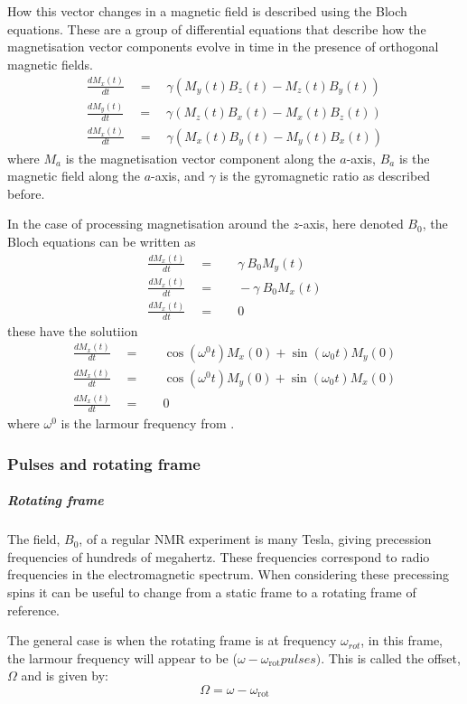 How this vector changes in a magnetic field is described using the Bloch equations\citep{Bloch:1946hk}. These are a group of differential equations that
describe how the magnetisation vector components evolve in time in the
presence of orthogonal magnetic fields.
\begin{align}\label{eqn:Bloch}
  \frac{dM_x(t)}{dt}\quad=\quad\gamma(M_y(t)B_z(t)-M_z(t)B_y(t))\\
  \frac{dM_y(t)}{dt}\quad=\quad\gamma(M_z(t)B_x(t)-M_x(t)B_z(t))\\
  \frac{dM_x(t)}{dt}\quad=\quad\gamma(M_x(t)B_y(t)-M_y(t)B_x(t))
\end{align}
where $M_a$ is the magnetisation vector component along the $a$-axis, $B_a$ is the
magnetic field along the $a$-axis, and $\gamma$ is the gyromagnetic ratio as described before.

In the case of processing magnetisation around the $z$-axis, here denoted $B_0$, the
Bloch equations can be written as
\begin{align}
  \frac{dM_x(t)}{dt}\quad=&\quad\gamma~B_0M_y(t)\\
  \frac{dM_x(t)}{dt}\quad=&\quad-\gamma~B_0M_x(t)\\
  \frac{dM_x(t)}{dt}\quad=&\quad0
\end{align}
these have the solutiion
\begin{align}
  \frac{dM_x(t)}{dt}\quad=&\quad\cos(\omega^0t)M_x(0) + \sin(\omega_0t)M_y(0)\\
  \frac{dM_x(t)}{dt}\quad=&\quad\cos(\omega^0t)M_y(0) + \sin(\omega_0t)M_x(0)\\
  \frac{dM_x(t)}{dt}\quad=&\quad0
\end{align}
where $\omega^0$ is the larmour frequency from .

\subsubsection{Pulses and rotating frame}

\subparagraph{Rotating frame}

The field, $B_0$, of a regular NMR experiment is many Tesla, giving precession
frequencies of hundreds of megahertz. These frequencies correspond to radio frequencies in the electromagnetic spectrum. When considering these precessing spins
it can be useful to change from a static frame to a rotating frame of reference.

The general case is when the rotating frame is at frequency $\omega_{rot}$, in this
frame, the larmour frequency will appear to be ($\omega - \omega_{\text{rot}}pulses
)$. This is called the offset,$\Omega$ and is given by:
\begin{equation}
  \Omega = \omega -\omega_{\text{rot}}
\end{equation}

